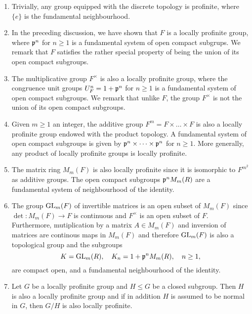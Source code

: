 \begin{examples} \label{example_prof_groups}

    \begin{enumerate}
        \item Trivially, any group equipped with the discrete topology is profinite, where $\{e\}$ is the fundamental neighbourhood.
        \item In the preceding discussion, we have shown that $F$ is a locally profinite group, where $\mathfrak{p}^n$ for $n\geq1$ is a fundamental system of open compact subgrups. We remark that $F$ satisfies the rather special property of being the union of its open compact subgroups. %
        \item The multiplicative group $F^{\times}$ is also a locally profinite group, where the congruence unit groups $U_F^n=1+\mathfrak{p}^n$ for $n\geq1$ is a fundamental system of open compact subgroups. We remark that unlike $F$, the group $F^{\times}$ is not the union of its open compact subgroups.
        \item Given $m\geq1$ an integer, the additive group $F^m=F\times\dots\times F$ is also a locally profinite group endowed with the product topology. A fundamental system of open compact subgroups is given by $\mathfrak{p}^{n}\times\dots\times\mathfrak{p}^{n}$ for $n\geq1$. More generally, any product of locally profinite groups is locally profinite.
        \item The matrix ring $M_m(F)$ is also locally profinite since it is isomorphic to $F^{m^2}$ as additive groups. The open compact subgroups $\mathfrak{p}^n M_m(R)$ are a fundamental system of neighbourhood of the identity.
        \item The group $\mathrm{GL}_m(F)$ of invertible matrices is an open subset of $M_m(F)$ since $\det:M_m(F)\rightarrow F$ is continuous and $F^{\times}$ is an open subset of $F$. Furthermore, mutiplication by a matrix $A\in M_m(F)$ and inversion of matrices are continous maps in $M_m(F)$ and therefore $\mathrm{GL}_m(F)$ is also a topological group and the subgroups
        $$K=\mathrm{GL}_m(R),\quad K_n=1+\mathfrak{p}^nM_m(R),\quad n\geq 1,$$
        are compact open, and a fundamental neighbourhood of the identity.
        \item Let $G$ be a locally profinite group and $H\leq G$ be a closed subgroup. Then $H$ is also a locally profinite group and if in addition $H$ is assumed to be normal in $G$, then $G/H$ is also locally profinite. 
        
    \end{enumerate}
\end{examples}


